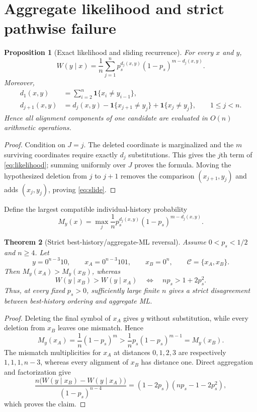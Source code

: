 \documentclass[11pt]{article}
\newtheorem{theorem}{Theorem}
\newtheorem{proposition}[theorem]{Proposition}
\theoremstyle{remark}
\newcommand{\C}{\mathcal C}
\newcommand{\one}{\mathbf 1}
\begin{document}
\section{Aggregate likelihood and strict pathwise failure}
\begin{proposition}[Exact likelihood and sliding recurrence]
For every $x$ and $y$,
\begin{equation}
 W(y\mid x)=\frac1n\sum_{j=1}^{n}
 p_s^{d_j(x,y)}(1-p_s)^{m-d_j(x,y)}.
 \label{eq:likelihood}
\end{equation}
Moreover,
\begin{align}
 d_1(x,y)&=\sum_{i=2}^{n}\one\{x_i\ne y_{i-1}\},\label{eq:d1}\\
 d_{j+1}(x,y)&=d_j(x,y)-\one\{x_{j+1}\ne y_j\}
 +\one\{x_j\ne y_j\},\qquad 1\le j<n.\label{eq:slide}
\end{align}
Hence all alignment components of one candidate are evaluated in $O(n)$ arithmetic operations.
\end{proposition}
\begin{proof}
Condition on $J=j$.  The deleted coordinate is marginalized and the $m$ surviving coordinates
require exactly $d_j$ substitutions.  This gives the $j$th term of \eqref{eq:likelihood}; summing
uniformly over $J$ proves the formula.  Moving the hypothesized deletion from $j$ to $j+1$ removes
the comparison $(x_{j+1},y_j)$ and adds $(x_j,y_j)$, proving \eqref{eq:slide}.
\end{proof}

Define the largest compatible individual-history probability
\[
 M_y(x)=\max_j\frac1n p_s^{d_j(x,y)}(1-p_s)^{m-d_j(x,y)}.
\]

\begin{theorem}[Strict best-history/aggregate-ML reversal]
Assume $0<p_s<1/2$ and $n\ge4$. Let
\[
 y=0^{n-3}10,\qquad x_A=0^{n-3}101,\qquad x_B=0^n,
 \qquad \C=\{x_A,x_B\}.
\]
Then $M_y(x_A)>M_y(x_B)$, whereas
\[
 W(y\mid x_B)>W(y\mid x_A)
 \quad\Longleftrightarrow\quad np_s>1+2p_s^2.
\]
Thus, at every fixed $p_s>0$, sufficiently large finite $n$ gives a strict disagreement between
best-history ordering and aggregate ML.
\end{theorem}
\begin{proof}
Deleting the final symbol of $x_A$ gives $y$ without substitution, while every deletion from
$x_B$ leaves one mismatch. Hence
\[
 M_y(x_A)=\frac1n(1-p_s)^m>
 \frac1n p_s(1-p_s)^{m-1}=M_y(x_B).
\]
The mismatch multiplicities for $x_A$ at distances $0,1,2,3$ are respectively
$1,1,1,n-3$, whereas every alignment of $x_B$ has distance one. Direct aggregation and
factorization give
\[
 \frac{n\bigl(W(y\mid x_B)-W(y\mid x_A)\bigr)}{(1-p_s)^{n-4}}
 =(1-2p_s)(np_s-1-2p_s^2),
\]
which proves the claim.
\end{proof}
\end{document}
